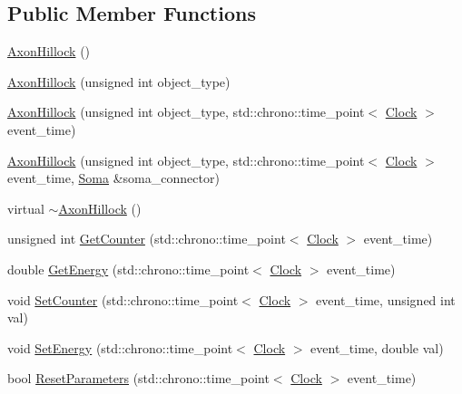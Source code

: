 \subsection*{Public Member Functions}
\begin{DoxyCompactItemize}
\item 
\mbox{\hyperlink{classAxonHillock_a432095dfb25ece393cdd83b5eb4f097a}{Axon\+Hillock}} ()
\item 
\mbox{\hyperlink{classAxonHillock_a20a4da0885f32bfca34ab5cda2a13562}{Axon\+Hillock}} (unsigned int object\+\_\+type)
\item 
\mbox{\hyperlink{classAxonHillock_acc61c61c8dfddd603e868a2fcbfd5e9c}{Axon\+Hillock}} (unsigned int object\+\_\+type, std\+::chrono\+::time\+\_\+point$<$ \mbox{\hyperlink{universe_8h_a0ef8d951d1ca5ab3cfaf7ab4c7a6fd80}{Clock}} $>$ event\+\_\+time)
\item 
\mbox{\hyperlink{classAxonHillock_a250945e24a51475369b6c7881c0d955b}{Axon\+Hillock}} (unsigned int object\+\_\+type, std\+::chrono\+::time\+\_\+point$<$ \mbox{\hyperlink{universe_8h_a0ef8d951d1ca5ab3cfaf7ab4c7a6fd80}{Clock}} $>$ event\+\_\+time, \mbox{\hyperlink{classSoma}{Soma}} \&soma\+\_\+connector)
\item 
virtual \mbox{\hyperlink{classAxonHillock_ae86220026d7c87edc1c514521d66f992}{$\sim$\+Axon\+Hillock}} ()
\item 
unsigned int \mbox{\hyperlink{classAxonHillock_a429c9876d679fe8de4533725afc4875c}{Get\+Counter}} (std\+::chrono\+::time\+\_\+point$<$ \mbox{\hyperlink{universe_8h_a0ef8d951d1ca5ab3cfaf7ab4c7a6fd80}{Clock}} $>$ event\+\_\+time)
\item 
double \mbox{\hyperlink{classAxonHillock_ab5ac3ab8771b96acf7e3fa07152525a5}{Get\+Energy}} (std\+::chrono\+::time\+\_\+point$<$ \mbox{\hyperlink{universe_8h_a0ef8d951d1ca5ab3cfaf7ab4c7a6fd80}{Clock}} $>$ event\+\_\+time)
\item 
void \mbox{\hyperlink{classAxonHillock_a0220cee0ad99ddc48496982078c1856c}{Set\+Counter}} (std\+::chrono\+::time\+\_\+point$<$ \mbox{\hyperlink{universe_8h_a0ef8d951d1ca5ab3cfaf7ab4c7a6fd80}{Clock}} $>$ event\+\_\+time, unsigned int val)
\item 
void \mbox{\hyperlink{classAxonHillock_a830afd18810e0eaa11a9e7a500b8f0c4}{Set\+Energy}} (std\+::chrono\+::time\+\_\+point$<$ \mbox{\hyperlink{universe_8h_a0ef8d951d1ca5ab3cfaf7ab4c7a6fd80}{Clock}} $>$ event\+\_\+time, double val)
\item 
bool \mbox{\hyperlink{classAxonHillock_acec1571ef0b74f7f5ce6699c9b459b4f}{Reset\+Parameters}} (std\+::chrono\+::time\+\_\+point$<$ \mbox{\hyperlink{universe_8h_a0ef8d951d1ca5ab3cfaf7ab4c7a6fd80}{Clock}} $>$ event\+\_\+time)

\end{DoxyCompactItemize}
